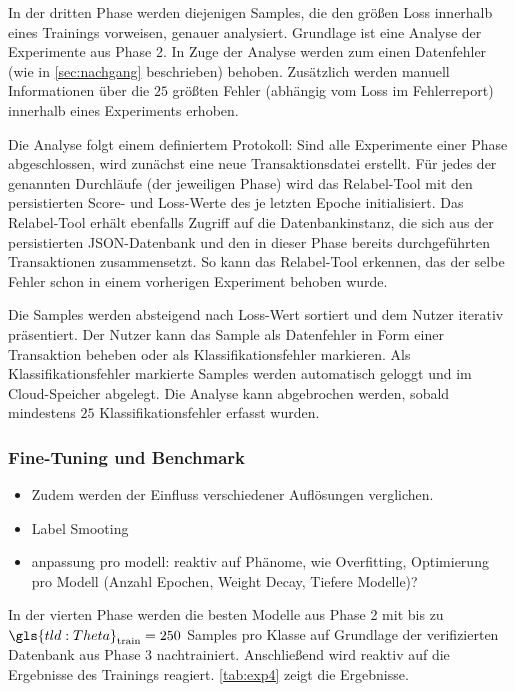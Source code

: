 In der dritten Phase werden diejenigen Samples, die den größen Loss innerhalb eines Trainings vorweisen, genauer analysiert.
Grundlage ist eine Analyse der Experimente aus Phase 2.
In Zuge der Analyse werden zum einen Datenfehler (wie in \autoref{sec:nachgang} beschrieben) behoben.
Zusätzlich werden manuell Informationen über die $25$ größten Fehler (abhängig vom Loss im Fehlerreport) innerhalb eines Experiments erhoben.

Die Analyse folgt einem definiertem Protokoll:
Sind alle Experimente einer Phase abgeschlossen, wird zunächst eine neue Transaktionsdatei erstellt.
Für jedes der genannten Durchläufe (der jeweiligen Phase) wird das Relabel-Tool mit den persistierten Score- und Loss-Werte des je letzten Epoche initialisiert.
Das Relabel-Tool erhält ebenfalls Zugriff auf die Datenbankinstanz, die sich aus der persistierten JSON-Datenbank und den in dieser Phase bereits durchgeführten Transaktionen zusammensetzt.
So kann das Relabel-Tool \ua erkennen, das der selbe Fehler schon in einem vorherigen Experiment behoben wurde.

Die Samples werden absteigend nach Loss-Wert sortiert und dem Nutzer iterativ präsentiert.
Der Nutzer kann das Sample als Datenfehler in Form einer Transaktion beheben oder als Klassifikationsfehler markieren.
Als Klassifikationsfehler markierte Samples werden automatisch geloggt und im Cloud-Speicher abgelegt.
Die Analyse kann abgebrochen werden, sobald mindestens $25$ Klassifikationsfehler erfasst wurden.

\subsubsection{Fine-Tuning und Benchmark}

\begin{tcolorbox}[title=Todo]
    \begin{itemize}
        \item Zudem werden der Einfluss verschiedener Auflösungen verglichen.
        \item Label Smooting
        \item anpassung pro modell: reaktiv auf Phänome, wie Overfitting, Optimierung pro Modell (Anzahl Epochen, Weight Decay, Tiefere Modelle)?
    \end{itemize}
\end{tcolorbox}

In der vierten Phase werden die besten Modelle aus Phase 2 mit bis zu $\gls{tld:Theta}_\text{train} = 250$ Samples pro Klasse auf Grundlage der verifizierten Datenbank aus Phase 3 nachtrainiert.
Anschließend wird reaktiv auf die Ergebnisse des Trainings reagiert.
\autoref{tab:exp4} zeigt die Ergebnisse.

